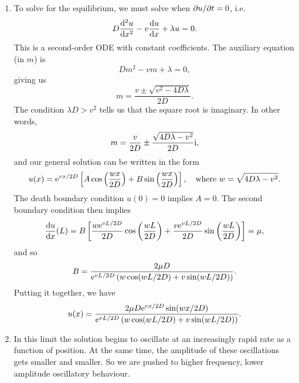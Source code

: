 \documentclass[a4paper, 12pt]{article}
\begin{document}
\begin{enumerate}[label={\bf \arabic{*}.\;}, ref={\arabic{*}},itemsep=3ex, left=0ex]
{\begin{enumerate}[label=(\alph*)]
{            The boundary conditions will be at $x=0$ and $x=L$. The death condition at $x=0$ requires the population is zero at this point, $u(0,t)=0$. The density gradient condition requires that $\pd{u}{x}(L,t)=\mu$.
          }
        \item{
            To solve for the equilibrium, we must solve when $\pd{u}{t} = 0$, i.e.\
            \begin{equation}
              D\fdd{u}{x} - v\fd{u}{x}+\lambda u =0.
            \end{equation}
            This is a second-order ODE with constant coefficients. The auxiliary equation (in $m$) is
            \begin{equation}
              Dm^2 - vm + \lambda = 0,
            \end{equation}
            giving us
            \begin{equation}
              m = \frac{v \pm \sqrt{v^2 - 4D\lambda}}{2D}.
            \end{equation}
            The condition $\lambda D> v^2$ tells us that the square root is imaginary. In other words,
            \begin{equation}
              m = \frac{v}{2D} \pm \frac{\sqrt{4D\lambda-v^2}}{2D}\mathrm{i},
            \end{equation}
            and our general solution can be written in the form
            \begin{equation}
              u(x) = \mathrm{e} ^{vx/2D}\left[A\cos\left(\frac{wx}{2D}\right)+B\sin\left(\frac{wx}{2D}\right) \right],\quad \text{where } w = \sqrt{4D\lambda-v^2}.
            \end{equation}
            The death boundary condition $u(0) =0$ implies $A = 0$. The second boundary condition then implies
            \begin{equation}
              \fd{u}{x}(L) = B\left[\frac{w\e ^{vL/2D}}{2 D}\cos\left(\frac{wL}{2D}\right) + \frac{v\e ^{vL/2D}}{2D}\sin\left(\frac{wL}{2D}\right) \right] =\mu,
            \end{equation}
            and so
            \begin{equation}
              B = \frac{2\mu D}{\mathrm{e} ^{v L/2 D}\left(w \cos(w L/2 D)+ v\sin(w L/2 D) \right)}.
            \end{equation}
            Putting it together, we have
            \begin{equation}
              u(x) = \frac{2\mu D\mathrm{e} ^{v x/2 D}\sin(w x/2 D)}{\mathrm{e} ^{vL/2D}\left(w \cos(w L/2 D)+ v\sin(w L/2 D) \right)}.
            \end{equation}
          }
        \item{
            In this limit the solution begins to oscillate at an increasingly rapid rate as a function of position. At the same time, the amplitude of these oscillations gets smaller and smaller. So we are pushed to higher frequency, lower amplitude oscillatory behaviour.
          }
      \end{enumerate}

}
\end{enumerate}
\end{document}
